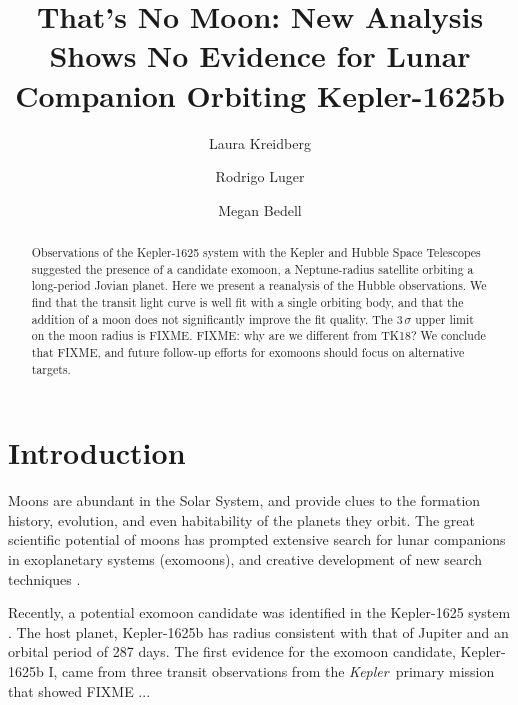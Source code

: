 \documentclass[twocolumn]{aastex62}
\newcommand{\project}[1]{\textsl{#1}}
\newcommand{\Kepler}{\project{Kepler}}
\begin{document}
\title{That's No Moon: New Analysis Shows No Evidence for Lunar Companion Orbiting Kepler-1625b}

\author{Laura Kreidberg}
\author{Rodrigo Luger}
\author{Megan Bedell}

\begin{abstract}
    Observations of the Kepler-1625 system with the Kepler and Hubble Space Telescopes suggested the presence of a candidate exomoon, a Neptune-radius satellite orbiting a long-period Jovian planet. Here we present a reanalysis of the Hubble observations. We find that the transit light curve is well fit with a single orbiting body, and that the addition of a moon does not significantly improve the fit quality. The $3\,\sigma$ upper limit on the moon radius is FIXME. FIXME: why are we different from TK18?  We conclude that FIXME, and future follow-up efforts for exomoons should focus on alternative targets.
\end{abstract}


\section{Introduction} \label{sec:intro}
Moons are abundant in the Solar System, and provide clues to the formation history, evolution, and even habitability of the planets they orbit. The great scientific potential of moons has prompted extensive search for lunar companions in exoplanetary systems (exomoons), and creative development of new search techniques \citep[e.g.][]{kipping09a, kipping09b, kipping13, simon10, peters13, heller14, noyola14, hippke15, agol15, sengupta16, vanderburg18}. 

Recently, a potential exomoon candidate was identified in the Kepler-1625 system \citep{teachey18a}. The host planet, Kepler-1625b has radius consistent with that of Jupiter and an orbital period of 287 days.  The first evidence for the exomoon candidate, Kepler-1625b I, came from three transit observations from the \Kepler\ primary mission that showed FIXME \citep{teachey18a}...


\end{document}
